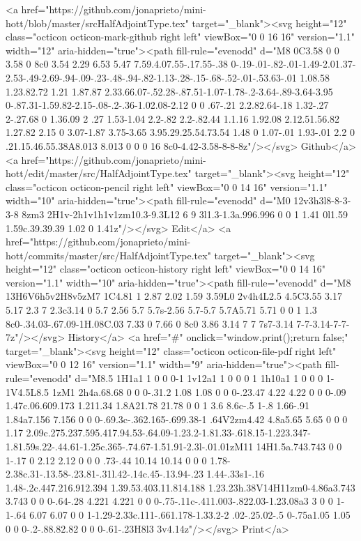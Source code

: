       <a href="https://github.com/jonaprieto/mini-hott/blob/master/srcHalfAdjointType.tex" target="_blank"><svg height="12" class="octicon octicon-mark-github right left" viewBox="0 0 16 16" version="1.1" width="12" aria-hidden="true"><path fill-rule="evenodd" d="M8 0C3.58 0 0 3.58 0 8c0 3.54 2.29 6.53 5.47 7.59.4.07.55-.17.55-.38 0-.19-.01-.82-.01-1.49-2.01.37-2.53-.49-2.69-.94-.09-.23-.48-.94-.82-1.13-.28-.15-.68-.52-.01-.53.63-.01 1.08.58 1.23.82.72 1.21 1.87.87 2.33.66.07-.52.28-.87.51-1.07-1.78-.2-3.64-.89-3.64-3.95 0-.87.31-1.59.82-2.15-.08-.2-.36-1.02.08-2.12 0 0 .67-.21 2.2.82.64-.18 1.32-.27 2-.27.68 0 1.36.09 2 .27 1.53-1.04 2.2-.82 2.2-.82.44 1.1.16 1.92.08 2.12.51.56.82 1.27.82 2.15 0 3.07-1.87 3.75-3.65 3.95.29.25.54.73.54 1.48 0 1.07-.01 1.93-.01 2.2 0 .21.15.46.55.38A8.013 8.013 0 0 0 16 8c0-4.42-3.58-8-8-8z"/></svg> Github</a>
      <a href="https://github.com/jonaprieto/mini-hott/edit/master/src/HalfAdjointType.tex" target="_blank"><svg height="12" class="octicon octicon-pencil right left" viewBox="0 0 14 16" version="1.1" width="10" aria-hidden="true"><path fill-rule="evenodd" d="M0 12v3h3l8-8-3-3-8 8zm3 2H1v-2h1v1h1v1zm10.3-9.3L12 6 9 3l1.3-1.3a.996.996 0 0 1 1.41 0l1.59 1.59c.39.39.39 1.02 0 1.41z"/></svg> Edit</a>
      <a href="https://github.com/jonaprieto/mini-hott/commits/master/src/HalfAdjointType.tex" target="_blank"><svg height="12" class="octicon octicon-history right left" viewBox="0 0 14 16" version="1.1" width="10" aria-hidden="true"><path fill-rule="evenodd" d="M8 13H6V6h5v2H8v5zM7 1C4.81 1 2.87 2.02 1.59 3.59L0 2v4h4L2.5 4.5C3.55 3.17 5.17 2.3 7 2.3c3.14 0 5.7 2.56 5.7 5.7s-2.56 5.7-5.7 5.7A5.71 5.71 0 0 1 1.3 8c0-.34.03-.67.09-1H.08C.03 7.33 0 7.66 0 8c0 3.86 3.14 7 7 7s7-3.14 7-7-3.14-7-7-7z"/></svg> History</a>
      <a  href="#" onclick="window.print();return false;" target="_blank"><svg height="12" class="octicon octicon-file-pdf right left" viewBox="0 0 12 16" version="1.1" width="9" aria-hidden="true"><path fill-rule="evenodd" d="M8.5 1H1a1 1 0 0 0-1 1v12a1 1 0 0 0 1 1h10a1 1 0 0 0 1-1V4.5L8.5 1zM1 2h4a.68.68 0 0 0-.31.2 1.08 1.08 0 0 0-.23.47 4.22 4.22 0 0 0-.09 1.47c.06.609.173 1.211.34 1.8A21.78 21.78 0 0 1 3.6 8.6c-.5 1-.8 1.66-.91 1.84a7.156 7.156 0 0 0-.69.3c-.362.165-.699.38-1 .64V2zm4.42 4.8a5.65 5.65 0 0 0 1.17 2.09c.275.237.595.417.94.53-.64.09-1.23.2-1.81.33-.618.15-1.223.347-1.81.59s.22-.44.61-1.25c.365-.74.67-1.51.91-2.3l-.01.01zM11 14H1.5a.743.743 0 0 1-.17 0 2.12 2.12 0 0 0 .73-.44 10.14 10.14 0 0 0 1.78-2.38c.31-.13.58-.23.81-.31l.42-.14c.45-.13.94-.23 1.44-.33s1-.16 1.48-.2c.447.216.912.394 1.39.53.403.11.814.188 1.23.23h.38V14H11zm0-4.86a3.743 3.743 0 0 0-.64-.28 4.221 4.221 0 0 0-.75-.11c-.411.003-.822.03-1.23.08a3 3 0 0 1-1-.64 6.07 6.07 0 0 1-1.29-2.33c.111-.661.178-1.33.2-2 .02-.25.02-.5 0-.75a1.05 1.05 0 0 0-.2-.88.82.82 0 0 0-.61-.23H8l3 3v4.14z"/></svg> Print</a>
